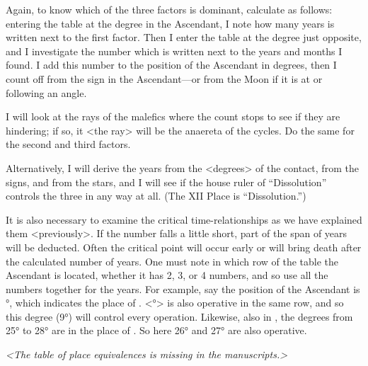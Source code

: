 Again, to know which of the three factors is dominant, calculate as follows: entering the table at the degree in the Ascendant, I note how many years is written next to the first factor. Then I enter the table at
the degree just opposite, and I investigate the number which is written next to the years and months I found. I add this number to the position of the Ascendant in degrees, then I count off from the sign in the
Ascendant—or from the Moon if it is at or following an angle. 

I will look at the rays of the malefics where the count stops to see if they are hindering; if so, it <the ray> will be the anaereta of the cycles. Do the same for the second and third factors.

Alternatively, I will derive the years from the <degrees> of the contact, from the signs, and from the stars, and I will see if the house ruler of “Dissolution” controls the three in any way at all. (The XII Place
is “Dissolution.”) 

It is also necessary to examine the critical time-relationships as we have explained them <previously>. If the number falls a little short, part of the span of years will be deducted. Often the critical
point will occur early or will bring death after the calculated number of years. One must note in which row of the table the Ascendant is located, whether it has 2, 3, or 4 numbers, and so use all the numbers together for the years. For example, say the position of the Ascendant is \Cancer\xspace 8°, which indicates the place of \Taurus. <\Cancer\xspace 9°> is also operative in the same row, and so this degree (9°) will control every operation. Likewise, also in \Cancer, the degrees from 25° to 28° are in the place of \Aquarius. So here 26°
and 27° are also operative.

\textit{<The table of place equivalences is missing in the manuscripts.>}
\newpage